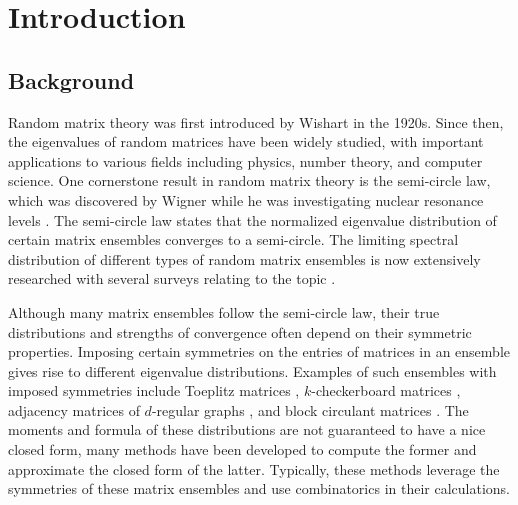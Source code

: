 \documentclass[11pt,reqno]{amsart}
\numberwithin{equation}{section}
\theoremstyle{plain}
\begin{document}
\section{Introduction}

\subsection{Background}
Random matrix theory was first introduced by Wishart \cite{Wishart} in the 1920s. Since then, the eigenvalues of random matrices have been widely studied, with important applications to various fields including physics, number theory, and computer science. One cornerstone result in random matrix theory is the semi-circle law, which was discovered by Wigner while he was investigating nuclear resonance levels \cite{Wigner1,Wigner2}. The semi-circle law states that the normalized eigenvalue distribution of certain matrix ensembles converges to a semi-circle. The limiting spectral distribution of different types of random matrix ensembles is now extensively researched with several surveys relating to the topic \cite{BasBo1,BasBo2,BLMST,BHS1,BHS2,FM,GKMN,Toeplitz,McK,Me}.

Although many matrix ensembles follow the semi-circle law, their true distributions and strengths of convergence often depend on their symmetric properties. Imposing certain symmetries on the entries of matrices in an ensemble gives rise to different eigenvalue distributions. Examples of such ensembles with imposed symmetries include Toeplitz matrices \cite{Toeplitz}, $k$-checkerboard matrices \cite{split}, adjacency matrices of $d$-regular graphs \cite{GKMN}, and block circulant matrices \cite{Block Circulant}. The moments and formula of these distributions are not guaranteed to have a nice closed form, many methods have been developed to compute the former and approximate the closed form of the latter. Typically, these methods leverage the symmetries of these matrix ensembles and use combinatorics in their calculations.
\end{document}
